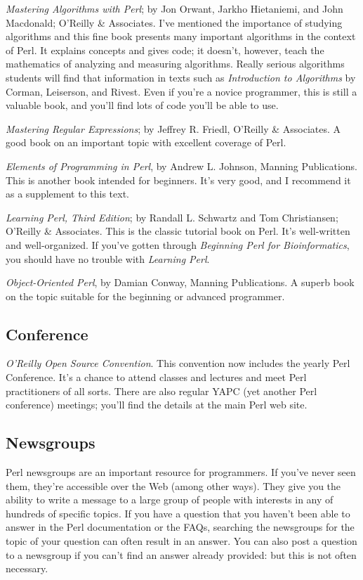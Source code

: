 \textit{Mastering Algorithms with Perl}; by Jon Orwant, Jarkho Hietaniemi, and John Macdonald; O'Reilly \& Associates. I've mentioned the importance of studying algorithms and this fine book presents many important algorithms in the context of Perl. It explains concepts and gives code; it doesn't, however, teach the mathematics of analyzing and measuring algorithms. Really serious algorithms students will find that information in texts such as \textit{Introduction to Algorithms} by Corman, Leiserson, and Rivest. Even if you're a novice programmer, this is still a valuable book, and you'll find lots of code you'll be able to use.

\textit{Mastering Regular Expressions}; by Jeffrey R. Friedl, O'Reilly \& Associates. A good book on an important topic with excellent coverage of Perl.

\textit{Elements of Programming in Perl}, by Andrew L. Johnson, Manning Publications. This is another book intended for beginners. It's very good, and I recommend it as a supplement to this text.

\textit{Learning Perl, Third Edition}; by Randall L. Schwartz and Tom Christiansen; O'Reilly \& Associates. This is the classic tutorial book on Perl. It's well-written and well-organized. If you've gotten through \textit{Beginning Perl for Bioinformatics}, you should have no trouble with \textit{Learning Perl}.

\textit{Object-Oriented Perl}, by Damian Conway, Manning Publications. A superb book on the topic suitable for the beginning or advanced programmer.

\subsection{Conference}
\textit{O'Reilly Open Source Convention}. This convention now includes the yearly Perl Conference. It's a chance to attend classes and lectures and meet Perl practitioners of all sorts. There are also regular YAPC (yet another Perl conference) meetings; you'll find the details at the main Perl web site.

\subsection{Newsgroups}
Perl newsgroups are an important resource for programmers. If you've never seen them, they're accessible over the Web (among other ways). They give you the ability to write a message to a large group of people with interests in any of hundreds of specific topics. If you have a question that you haven't been able to answer in the Perl documentation or the FAQs, searching the newsgroups for the topic of your question can often result in an answer. You can also post a question to a newsgroup if you can't find an answer already provided: but this is not often necessary.

